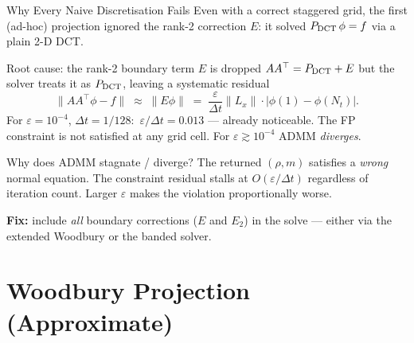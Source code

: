 \documentclass[10pt,aspectratio=169]{beamer}
\newcommand{\eps}{\varepsilon}
\newcommand{\Lx}{L_x}
\begin{document}
\begin{frame}{Why Every Naive Discretisation Fails}
  Even with a correct staggered grid, the first (ad-hoc) projection
  ignored the rank-2 correction $E$: it solved $P_{\rm DCT}\,\phi = f$
  via a plain 2-D DCT.

  \medskip
  \begin{alertblock}{Root cause: the rank-2 boundary term $E$ is dropped}
    $AA^\top = P_{\rm DCT} + E$ but the solver treats it as $P_{\rm DCT}$,
    leaving a systematic residual
    \[
      \|AA^\top\phi - f\| \;\approx\; \|E\phi\|
      \;=\; \frac{\eps}{\Delta t}\|\Lx\|\cdot|\phi(1)-\phi(N_t)|.
    \]
    For $\eps=10^{-4}$, $\Delta t=1/128$:\ $\eps/\Delta t=0.013$ — already
    noticeable.  The FP constraint is not satisfied at any grid cell.
    For $\eps \gtrsim 10^{-4}$ ADMM \emph{diverges}.
  \end{alertblock}

  \begin{block}{Why does ADMM stagnate / diverge?}
    The returned $(\rho,m)$ satisfies a \emph{wrong} normal equation.
    The constraint residual stalls at $O(\eps/\Delta t)$ regardless of
    iteration count.  Larger $\eps$ makes the violation proportionally worse.
  \end{block}

  \smallskip
  \textbf{Fix:} include \emph{all} boundary corrections ($E$ and $E_2$)
  in the solve — either via the extended Woodbury or the banded solver.
\end{frame}

\section{Woodbury Projection (Approximate)}
\end{document}
